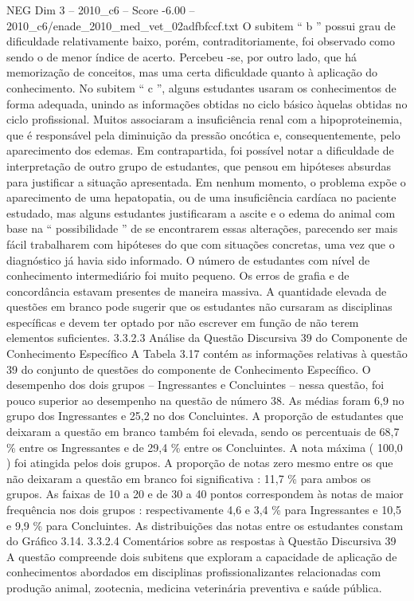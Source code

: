 \begin{textsample}{NEG Dim 3 – 2010\_c6 – Score -6.00 – 2010\_c6/enade\_2010\_med\_vet\_02adfbfccf.txt}
O subitem “ b ” possui grau de dificuldade relativamente baixo, porém, contraditoriamente, foi observado como sendo o de menor índice de acerto.
Percebeu -se, por outro lado, que há memorização de conceitos, mas uma certa dificuldade quanto à aplicação do conhecimento.
No subitem “ c ”, alguns estudantes usaram os conhecimentos de forma adequada, unindo as informações obtidas no ciclo básico àquelas obtidas no ciclo profissional.
Muitos associaram a insuficiência renal com a hipoproteinemia, que é responsável pela diminuição da pressão oncótica e, consequentemente, pelo aparecimento dos edemas.
Em contrapartida, foi possível notar a dificuldade de interpretação de outro grupo de estudantes, que pensou em hipóteses absurdas para justificar a situação apresentada.
Em nenhum momento, o problema expõe o aparecimento de uma hepatopatia, ou de uma insuficiência cardíaca no paciente estudado, mas alguns estudantes justificaram a ascite e o edema do animal com base na “ possibilidade ” de se encontrarem essas alterações, parecendo ser mais fácil trabalharem com hipóteses do que com situações concretas, uma vez que o diagnóstico já havia sido informado.
O número de estudantes com nível de conhecimento intermediário foi muito pequeno.
Os erros de grafia e de concordância estavam presentes de maneira massiva.
A quantidade elevada de questões em branco pode sugerir que os estudantes não cursaram as disciplinas específicas e devem ter optado por não escrever em função de não terem elementos suficientes. 3.3.2.3 Análise da Questão Discursiva 39 do Componente de Conhecimento Específico A Tabela 3.17 contém as informações relativas à questão 39 do conjunto de questões do componente de Conhecimento Específico.
O desempenho dos dois grupos – Ingressantes e Concluintes – nessa questão, foi pouco superior ao desempenho na questão de número 38.
As médias foram 6,9 no grupo dos Ingressantes e 25,2 no dos Concluintes.
A proporção de estudantes que deixaram a questão em branco também foi elevada, sendo os percentuais de 68,7 \% entre os Ingressantes e de 29,4 \% entre os Concluintes.
A nota máxima ( 100,0 ) foi atingida pelos dois grupos.
A proporção de notas zero mesmo entre os que não deixaram a questão em branco foi significativa : 11,7 \% para ambos os grupos.
As faixas de 10 a 20 e de 30 a 40 pontos correspondem às notas de maior frequência nos dois grupos : respectivamente 4,6 e 3,4 \% para Ingressantes e 10,5 e 9,9 \% para Concluintes.
As distribuições das notas entre os estudantes constam do Gráfico 3.14. 3.3.2.4 Comentários sobre as respostas à Questão Discursiva 39 A questão compreende dois subitens que exploram a capacidade de aplicação de conhecimentos abordados em disciplinas profissionalizantes relacionadas com produção animal, zootecnia, medicina veterinária preventiva e saúde pública.

\end{textsample}
